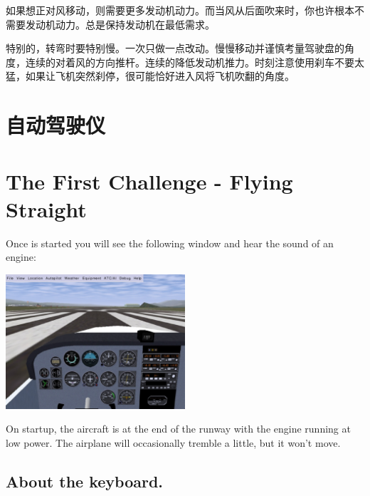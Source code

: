 \begin{itemize}
如果想正对风移动，则需要更多发动机动力。而当风从后面吹来时，你也许根本不需要发动机动力。总是保持发动机在最低需求。

特别的，转弯时要特别慢。一次只做一点改动。慢慢移动并谨慎考量驾驶盘的角度，连续的对着风的方向推杆。连续的降低发动机推力。时刻注意使用刹车不要太猛，如果让飞机突然刹停，很可能恰好进入风将飞机吹翻的角度。

\section{自动驾驶仪}
\label{sec:Autopilot}



\iffalse
\section{The First Challenge - Flying Straight}
\label{sec:FlyingStraight}

Once \FlightGear{} is started you will see the following window and hear the
sound of an engine:

\begin{center}
\includegraphics[width=0.5\textwidth]{img/tut_6}
\end{center}

On startup, the aircraft is at the end of the runway with the engine running
at low power. The airplane will occasionally tremble a little, but it won't
move.

\subsection*{About the keyboard.}


\end{itemize}
